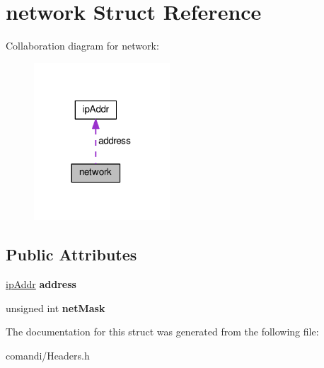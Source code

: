 \hypertarget{structnetwork}{}\section{network Struct Reference}
\label{structnetwork}


Collaboration diagram for network\+:
\nopagebreak
\begin{figure}[H]
\begin{center}
\leavevmode
\includegraphics[width=144pt]{d9/dc3/structnetwork__coll__graph}
\end{center}
\end{figure}
\subsection*{Public Attributes}
\begin{DoxyCompactItemize}
\item 
\hyperlink{unionipAddr}{ip\+Addr} {\bfseries address}\hypertarget{structnetwork_aadfdf4cd8bd0c69641dbbdcc6376bb10}{}\label{structnetwork_aadfdf4cd8bd0c69641dbbdcc6376bb10}

\item 
unsigned int {\bfseries net\+Mask}\hypertarget{structnetwork_a4b43d7f804814ac38a81108cfc538969}{}\label{structnetwork_a4b43d7f804814ac38a81108cfc538969}

\end{DoxyCompactItemize}


The documentation for this struct was generated from the following file\+:\begin{DoxyCompactItemize}
\item 
comandi/Headers.\+h\end{DoxyCompactItemize}
